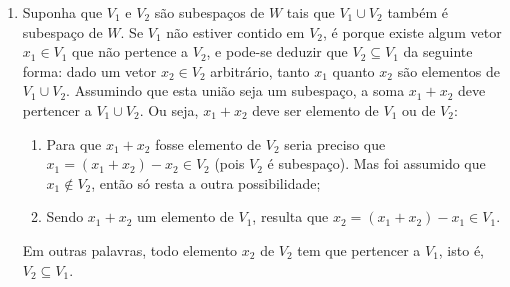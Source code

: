 \documentclass[12pt,a4paper]{article}
\begin{document}
\begin{enumerate}
\item Suponha que $V_1$ e $V_2$ são subespaços de $W$ tais que $V_1 \cup V_2$ também é subespaço de $W$. Se $V_1$ não estiver contido em $V_2$, é porque existe algum vetor $x_1 \in V_1$ que não pertence a $V_2$, e pode-se deduzir que $V_2 \subseteq V_1$ da seguinte forma: dado um vetor $x_2 \in V_2$ arbitrário, tanto $x_1$ quanto $x_2$ são elementos de $V_1 \cup V_2$. Assumindo que esta união seja um subespaço, a soma $x_1 + x_2$ deve pertencer a $V_1 \cup V_2$. Ou seja, $x_1 + x_2$ deve ser elemento de $V_1$ ou de $V_2$:
\begin{enumerate}
\item Para que $x_1 + x_2$ fosse elemento de $V_2$ seria preciso que $x_1 = (x_1 + x_2) - x_2 \in V_2$ (pois $V_2$ é subespaço). Mas foi assumido que $x_1 \not \in V_2$, então só resta a outra possibilidade;
\item Sendo $x_1 + x_2$ um elemento de $V_1$, resulta que $x_2 = (x_1 + x_2) - x_1 \in V_1$.
\end{enumerate}
Em outras palavras, todo elemento $x_2$ de $V_2$ tem que pertencer a $V_1$, isto é, $V_2 \subseteq V_1$.
\end{enumerate}
\end{document}
